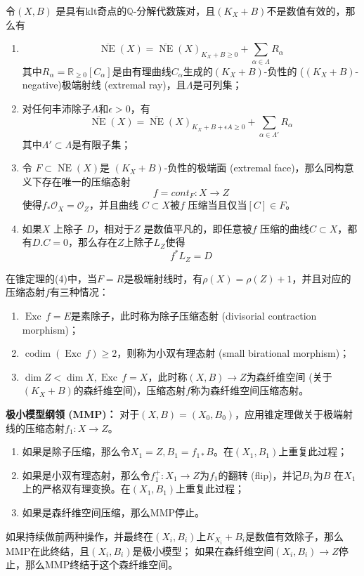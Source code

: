 \begin{theorem}[锥定理]\label{conethm}

令$(X,B)$ 是具有klt奇点的$\mathbb{Q}$-分解代数簇对，且$(K_{X}+B)$不是数值有效的，那么有
\begin{enumerate}
  \item
    \[ \overline{\operatorname{NE}}(X)=\overline{\operatorname{NE}}(X)_{K_{X}+B\geqslant 0} +\sum_{\alpha \in\Lambda} R_{\alpha}\] 
          其中$R_{\alpha}=\mathbb{R}_{\geqslant 0}[C_{\alpha}]$是由有理曲线$C_{\alpha}$生成的$(K_{X}+B) $-负性的 ($(K_{X}+B)$-negative)极端射线 (extremal ray)，且$\Lambda$是可列集；
  \item 对任何丰沛除子$A$和$ \epsilon >0 $，有
        \[ \overline{\operatorname{NE}}(X)=\overline{\operatorname{NE}}(X)_{K_{X}+B+\epsilon A\geqslant 0} +\sum_{\alpha \in\Lambda'}R_{\alpha} \]
        其中$\Lambda' \subset \Lambda$是有限子集；
  \item 令 $F \subset \overline{\operatorname{NE}}(X)$是 $(K_{X}+B)$-负性的极端面 (extremal face)，那么同构意义下存在唯一的压缩态射
    \[ f=cont_{F}:X \to Z \]
    使得$f_{*}\mathcal{O}_{X}=\mathcal{O}_{Z}$，并且曲线 $C \subset X$被$f$ 压缩当且仅当$[C] \in F$。 
  \item 如果$X$ 上除子 $D$，相对于$Z$ 是数值平凡的，即任意被$f$ 压缩的曲线$C \subset X$，都有$D.C=0$，那么存在$Z$上除子$L_{Z} $使得
    \[ f^{*}L_{Z} = D \]
\end{enumerate}
\end{theorem}
在锥定理的(4)中，当$F=R$是极端射线时，有$\rho(X)=\rho(Z)+1$，并且对应的压缩态射$f$有三种情况：
\begin{enumerate}
  \item $\operatorname{Exc}\,f=E$是素除子，此时称为除子压缩态射 (divisorial contraction morphism)；
  \item $\operatorname{codim }(\operatorname{Exc}\,f) \geqslant 2$，则称为小双有理态射 (small birational morphism)；
  \item $\dim Z < \dim X, \operatorname{Exc}\,f=X$，此时称$(X,B)\to Z$为森纤维空间 (关于$ (K_{X}+B) $的森纤维空间)，压缩态射$f$称为森纤维空间压缩态射。
\end{enumerate}
\textbf{极小模型纲领 (MMP)：}
对于$(X,B)=(X_{0},B_{0})$，应用锥定理做关于极端射线的压缩态射$f_{1}:X\to Z$。
\begin{enumerate}
  \item 如果是除子压缩，那么令$X_{1}=Z,B_{1}=f_{1*}B$。在$(X_{1},B_{1})$上重复此过程；
  \item 如果是小双有理态射，那么令$f^{+}_{1}:X_{1}\to Z$为$f_{1}$的翻转 (flip)，并记$B_{1}$为$B$ 在$X_{1}$上的严格双有理变换。在$(X_{1},B_{1})$上重复此过程；
  \item 如果是森纤维空间压缩，那么MMP停止。
\end{enumerate}
如果持续做前两种操作，并最终在$(X_{i},B_{i})$上$K_{X_{i}}+B_{i}$是数值有效除子，那么MMP在此终结，且$(X_{i},B_{i})$是极小模型；
如果在森纤维空间$(X_{i},B_{i})\to Z$停止，那么MMP终结于这个森纤维空间。


